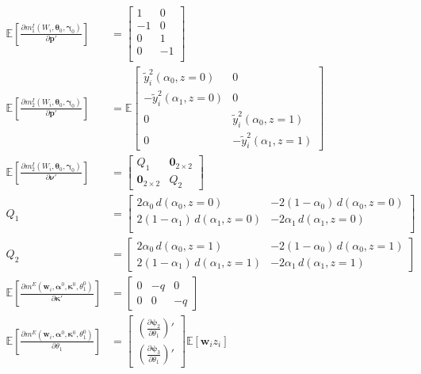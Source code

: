 \documentclass[12pt]{article}
\begin{document}
\begin{align*}
\mathbb{E}\left[\frac{\partial m_1^I(W_i, \boldsymbol{\theta}_0, \boldsymbol{\gamma}_0)}{\partial \mathbf{p}'}\right] &= 
\left[
\begin{array}{rrr}
  1 & 0 \\
  -1 & 0 \\
  0 & 1 \\
  0 & -1 \\
\end{array}
\right] \\
\mathbb{E}\left[\frac{\partial m^I_2(W_i, \boldsymbol{\theta}_0, \boldsymbol{\gamma}_0)}{\partial \mathbf{p}'} \right]
&= \mathbb{E}\left[
\begin{array}{rr}
  \widetilde{y}_i^2(\alpha_0, z=0) & 0 \\
  -\widetilde{y}_i^2(\alpha_1, z=0) & 0 \\
  0 & \widetilde{y}_i^2(\alpha_0, z=1)\\ 
  0 & -\widetilde{y}_i^2(\alpha_1, z=1)
\end{array}
\right]\\
\mathbb{E}\left[\frac{\partial m^I_2(W_i, \boldsymbol{\theta}_0, \boldsymbol{\gamma}_0)}{\partial \boldsymbol{\nu}'} \right]
 &= 
 \left[
 \begin{array}{rr}
   Q_1 & \mathbf{0}_{2\times 2}\\
   \mathbf{0}_{2\times 2} & Q_2
 \end{array}
 \right]\\
 Q_1 &=\left[
\begin{array}{rr}
   2\alpha_0\, d(\alpha_0, z=0)& -2(1 - \alpha_0)\, d(\alpha_0, z=0)\\
   2(1 - \alpha_1)\, d(\alpha_1, z=0)& -2\alpha_1\, d(\alpha_1, z=0) \\
\end{array}
\right]\\
Q_2 &= \left[
\begin{array}{cc}
  2 \alpha_0 \, d(\alpha_0, z=1) &
  -2 (1 - \alpha_0) \, d(\alpha_0, z=1)\\
  2 (1 - \alpha_1)\, d(\alpha_1, z=1) &
  -2\alpha_1 \, d(\alpha_1, z=1)
\end{array}
\right] \\
\mathbb{E}\left[\frac{\partial m^E\left( \mathbf{w}_i, \boldsymbol{\alpha}^0,  \boldsymbol{\kappa}^0, \theta_1^0 \right)}{\partial \boldsymbol{\kappa}'}\right] &= \left[
\begin{array}{ccc}
  0 & -q & 0 \\
  0 & 0 & -q
\end{array}
\right]\\ 
\mathbb{E}\left[\frac{\partial m^E\left( \mathbf{w}_i, \boldsymbol{\alpha}^0,  \boldsymbol{\kappa}^0, \theta_1^0 \right)}{\partial \theta_1}\right] &=
\left[
\begin{array}{c}
  \displaystyle\left( \frac{\partial \boldsymbol{\psi}_2}{\partial \theta_1} \right)'\\ 
  \displaystyle\left( \frac{\partial \boldsymbol{\psi}_3}{\partial \theta_1} \right)' 
\end{array}
\right] \mathbb{E}[\mathbf{w}_iz_i]
\end{align*}
\end{document}
